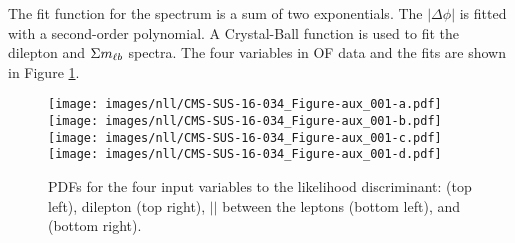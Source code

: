 The fit function for the \ptmiss spectrum is a sum of two exponentials. The $|\Delta\phi|$ is fitted with a second-order polynomial. 
A Crystal-Ball function is used to fit the dilepton \pt and $\Sigma m_{\ell b}$ spectra. 
The four variables in OF data and the fits are shown in Figure \ref{fig:pdfsNLL}.  
\begin{figure}[htbp!]
\begin{center}
    \texttt{[image: images/nll/CMS-SUS-16-034\_Figure-aux\_001-a.pdf]}
    \texttt{[image: images/nll/CMS-SUS-16-034\_Figure-aux\_001-b.pdf]} \\
    \texttt{[image: images/nll/CMS-SUS-16-034\_Figure-aux\_001-c.pdf]}
    \texttt{[image: images/nll/CMS-SUS-16-034\_Figure-aux\_001-d.pdf]}
    \caption{PDFs for the four input variables to the likelihood discriminant: \ptmiss (top left), dilepton \pt (top right),
    $|$\dphi$|$ between the leptons (bottom left), and \mlb (bottom right).}
\label{fig:pdfsNLL}
\end{center}
\end{figure}

